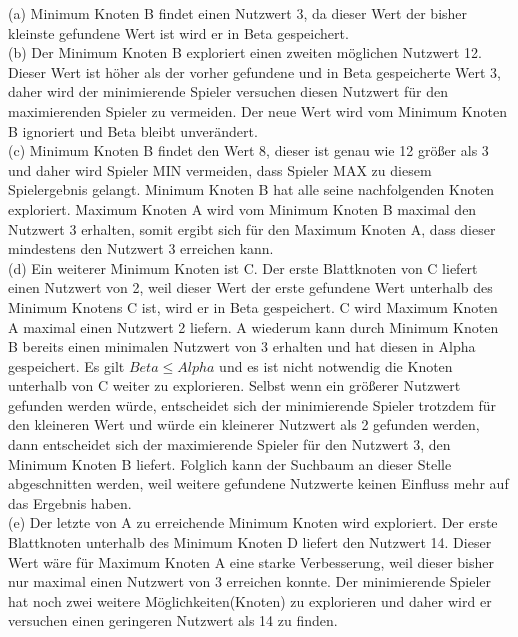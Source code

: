 (a) Minimum Knoten B findet einen Nutzwert 3, da dieser Wert der bisher kleinste gefundene Wert ist wird er in Beta gespeichert. \\

(b) Der Minimum Knoten B exploriert einen zweiten möglichen Nutzwert 12. Dieser Wert ist höher als der vorher gefundene und in Beta gespeicherte Wert 3, daher wird der minimierende Spieler versuchen diesen Nutzwert für den maximierenden Spieler zu vermeiden. Der neue Wert wird vom Minimum Knoten B ignoriert und Beta bleibt unverändert. \\

(c) Minimum Knoten B findet den Wert 8, dieser ist genau wie 12 größer als 3 und daher wird Spieler MIN vermeiden, dass Spieler MAX zu diesem Spielergebnis gelangt. Minimum Knoten B hat alle seine nachfolgenden Knoten exploriert. Maximum Knoten A wird vom Minimum Knoten B maximal den Nutzwert 3 erhalten, somit ergibt sich für den Maximum Knoten A, dass dieser mindestens den Nutzwert 3 erreichen kann. \\

(d) Ein weiterer Minimum Knoten ist C. Der erste Blattknoten von C liefert einen Nutzwert von 2, weil dieser Wert der erste gefundene Wert unterhalb des Minimum Knotens C ist, wird er in Beta gespeichert. C wird Maximum Knoten A maximal einen Nutzwert 2 liefern. A wiederum kann durch Minimum Knoten B bereits einen minimalen Nutzwert von 3 erhalten und hat diesen in Alpha gespeichert. Es gilt $Beta \leq Alpha$ und es ist nicht notwendig die Knoten unterhalb von C weiter zu explorieren. Selbst wenn ein größerer Nutzwert gefunden werden würde, entscheidet sich der minimierende Spieler trotzdem für den kleineren Wert und würde ein kleinerer Nutzwert als 2 gefunden werden, dann entscheidet sich der maximierende Spieler für den Nutzwert 3, den Minimum Knoten B liefert. Folglich kann der Suchbaum an dieser Stelle abgeschnitten werden, weil weitere gefundene Nutzwerte keinen Einfluss mehr auf das Ergebnis haben. \\

(e) Der letzte von A zu erreichende Minimum Knoten wird exploriert. Der erste Blattknoten unterhalb des Minimum Knoten D liefert den Nutzwert 14. Dieser Wert wäre für Maximum Knoten A eine starke Verbesserung, weil dieser bisher nur maximal einen Nutzwert von 3 erreichen konnte. Der minimierende Spieler hat noch zwei weitere Möglichkeiten(Knoten) zu explorieren und daher wird er versuchen einen geringeren Nutzwert als 14 zu finden. \\

